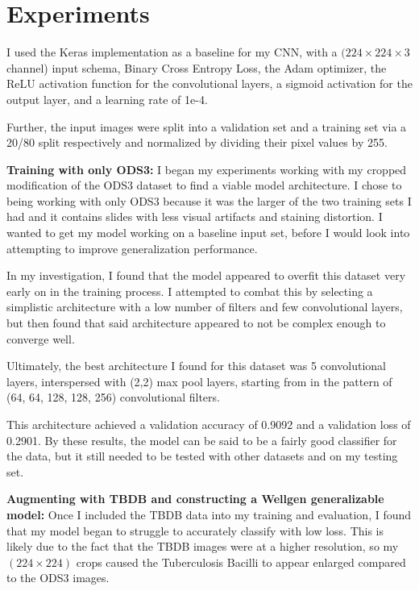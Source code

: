\documentclass{article}
\begin{document}
\section{Experiments}


I used the Keras implementation as a baseline for my CNN, with a $(224 \times 224 \times 3$ channel) input schema, Binary Cross Entropy Loss,
the Adam optimizer, the ReLU activation function for the convolutional layers, a sigmoid activation for the output layer, and a learning rate of 1e-4.

Further, the input images were split into a validation set and a training set via a 20/80 split respectively 
and normalized by dividing their pixel values by 255.

\textbf{Training with only ODS3:}
I began my experiments working with my cropped modification of the ODS3 dataset to find a viable model architecture. I chose to being
working with only ODS3 because it was the larger of the two training sets I had and it 
contains slides with less visual artifacts and staining distortion. I wanted to get my model
working on a baseline input set, before I would look into attempting to improve generalization performance.


In my investigation, I found that the model appeared to overfit this dataset very early on in the training process.
I attempted to combat this by selecting a simplistic architecture with a low number of filters and few convolutional layers,
but then found that said architecture appeared to not be complex enough to converge well.

Ultimately, the best architecture I found for this dataset was 5 convolutional layers, interspersed with (2,2) max pool layers, starting
from in the pattern of (64, 64, 128, 128, 256) convolutional filters.

This architecture achieved a validation accuracy of 0.9092 and a validation loss of 0.2901. By these results, the model can be said
to be a fairly good classifier for the data, but it still needed to be tested with other datasets and on my testing set.


\textbf{Augmenting with TBDB and constructing a Wellgen generalizable model:}
Once I included the TBDB data into my training and evaluation, I found that my model began to struggle to accurately classify with
low loss. This is likely due to the fact that the TBDB images were at a higher resolution, so my $(224 \times 224)$ crops caused the
Tuberculosis Bacilli to appear enlarged compared to the ODS3 images.
\end{document}
